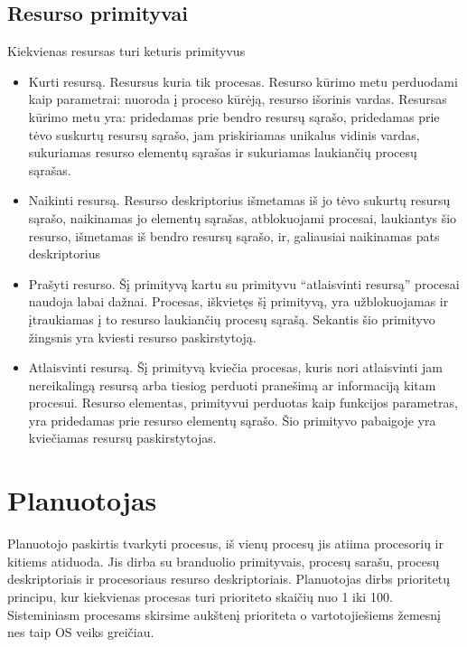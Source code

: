 \documentclass[oneside]{VUMIFPSkursinis}
\begin{document}
\subsection{Resurso primityvai} Kiekvienas resursas turi keturis primityvus
\begin{itemize}
	\item Kurti resursą. Resursus kuria tik procesas. Resurso kūrimo metu perduodami kaip parametrai: nuoroda į proceso kūrėją, resurso išorinis vardas. Resursas kūrimo metu yra: pridedamas prie bendro resursų sąrašo, pridedamas prie tėvo suskurtų resursų sąrašo, jam priskiriamas unikalus vidinis vardas, sukuriamas resurso elementų sąrašas ir sukuriamas laukiančių procesų sąrašas.
	\item Naikinti resursą. Resurso deskriptorius išmetamas iš jo tėvo sukurtų resursų sąrašo, naikinamas jo elementų sąrašas, atblokuojami procesai, laukiantys šio resurso, išmetamas iš bendro resursų sąrašo, ir, galiausiai naikinamas pats deskriptorius
	\item Prašyti resurso. Šį primityvą kartu su primityvu “atlaisvinti resursą” procesai naudoja labai dažnai. Procesas, iškvietęs šį primityvą, yra užblokuojamas ir įtraukiamas į to resurso laukiančių procesų sąrašą. Sekantis šio primityvo žingsnis yra kviesti resurso paskirstytoją.  
	\item Atlaisvinti resursą. Šį primityvą kviečia procesas, kuris nori atlaisvinti jam nereikalingą resursą arba tiesiog perduoti pranešimą ar informaciją kitam procesui. Resurso elementas, primityvui perduotas kaip funkcijos parametras, yra pridedamas prie resurso elementų sąrašo. Šio primityvo pabaigoje yra kviečiamas resursų paskirstytojas. 
 
 
 

\end{itemize}

\section{Planuotojas} Planuotojo paskirtis tvarkyti procesus, iš vienų procesų jis atiima procesorių ir kitiems atiduoda. Jis dirba su branduolio primityvais, procesų sarašu, procesų deskriptoriais ir procesoriaus resurso deskriptoriais. Planuotojas dirbs prioritetų principu, kur kiekvienas procesas turi prioriteto skaičių nuo 1 iki 100. Sisteminiasm procesams skirsime aukštenį prioriteta o vartotojiešiems žemesnį nes taip OS veiks greičiau.
\end{document}
